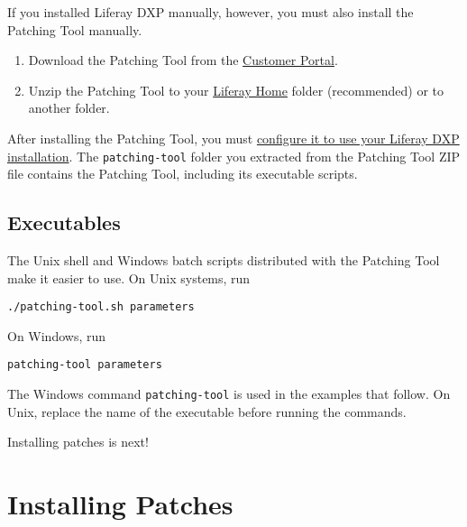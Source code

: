If you installed Liferay DXP manually, however, you must also install
the Patching Tool manually.

\begin{enumerate}
\def\labelenumi{\arabic{enumi}.}
\item
  Download the Patching Tool from the
  \href{https://customer.liferay.com/downloads?p_p_id=com_liferay_osb_customer_downloads_display_web_DownloadsDisplayPortlet&_com_liferay_osb_customer_downloads_display_web_DownloadsDisplayPortlet_productAssetCategoryId=118191019&_com_liferay_osb_customer_downloads_display_web_DownloadsDisplayPortlet_fileTypeAssetCategoryId=118191066}{Customer
  Portal}.
\item
  Unzip the Patching Tool to your
  \href{/docs/7-2/deploy/-/knowledge_base/d/liferay-home}{Liferay Home}
  folder (recommended) or to another folder.
\end{enumerate}

After installing the Patching Tool, you must
\href{/docs/7-2/deploy/-/knowledge_base/d/configuring-the-patching-tool}{configure
it to use your Liferay DXP installation}. The \texttt{patching-tool}
folder you extracted from the Patching Tool ZIP file contains the
Patching Tool, including its executable scripts.

\section{Executables}\label{executables}

The Unix shell and Windows batch scripts distributed with the Patching
Tool make it easier to use. On Unix systems, run

\begin{verbatim}
./patching-tool.sh parameters
\end{verbatim}

On Windows, run

\begin{verbatim}
patching-tool parameters
\end{verbatim}

The Windows command \texttt{patching-tool} is used in the examples that
follow. On Unix, replace the name of the executable before running the
commands.

Installing patches is next!

\chapter{Installing Patches}\label{installing-patches}

